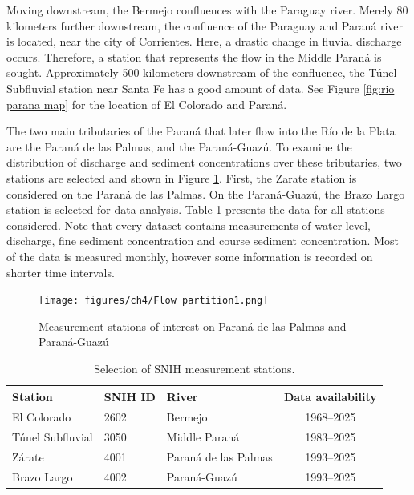 Moving downstream, the Bermejo confluences with the Paraguay river. Merely 80 kilometers further downstream, the confluence of the Paraguay and Paraná river is located, near the city of Corrientes. Here, a drastic change in fluvial discharge occurs. Therefore, a station that represents the flow in the Middle Paraná is sought. Approximately 500 kilometers downstream of the confluence, the Túnel Subfluvial station near Santa Fe has a good amount of data. See Figure \ref{fig:rio parana map} for the location of El Colorado and Paraná. 

The two main tributaries of the Paraná that later flow into the Río de la Plata are the Paraná de las Palmas, and the Paraná-Guazú. To examine the distribution of discharge and sediment concentrations over these tributaries, two stations are selected and shown in Figure \ref{fig:flow partition}. First, the Zarate station is considered on the Paraná de las Palmas. On the Paraná-Guazú, the Brazo Largo station is selected for data analysis. Table \ref{tab:stations data collection} presents the data for all stations considered. Note that every dataset contains measurements of water level, discharge, fine sediment concentration and course sediment concentration. Most of the data is measured monthly, however some information is recorded on shorter time intervals. 


\begin{figure}
    \centering
    \texttt{[image: figures/ch4/Flow partition1.png]}
    \caption{Measurement stations of interest on Paraná de las Palmas and Paraná-Guazú}
    \label{fig:flow partition}
\end{figure}



\begin{table}[H]
    \centering
    \renewcommand{\arraystretch}{1.2} %
    \setlength{\tabcolsep}{8pt}       %
    \begin{tabular}{lllc}
        \toprule
        \textbf{Station} & \textbf{SNIH ID} & \textbf{River} & \textbf{Data availability} \\
        \midrule
        El Colorado         & 2602 & Bermejo               & 1968--2025 \\
        Túnel Subfluvial    & 3050 & Middle Paraná         & 1983--2025 \\
        Zárate              & 4001 & Paraná de las Palmas  & 1993--2025 \\
        Brazo Largo         & 4002 & Paraná-Guazú          & 1993--2025 \\
        \bottomrule
    \end{tabular}
    \caption{Selection of SNIH measurement stations.}
    \label{tab:stations data collection}
\end{table}



